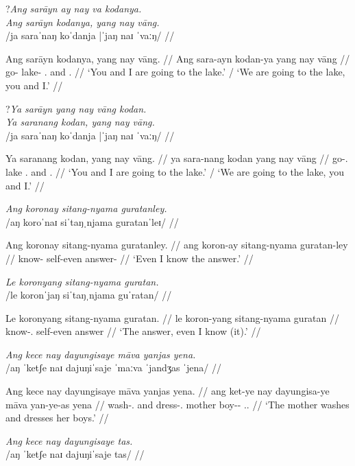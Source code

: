 \documentclass[12pt,a4paper]{scrartcl}
\newcommand{\TsgF}{{\Tsg}.{\F}}
\begin{document}
\ex\begingl
\glpreamble \judge?\textit{Ang sarāyn ay nay va kodanya.} \\
	\textit{Ang sarāyn kodanya, yang nay vāng.} \\
	/ja saraˈnaŋ koˈdanja |ˈjaŋ naɪ ˈvaːŋ/ //

\gla Ang sarāyn kodanya,  yang nay vāng. //
\glb Ang sara-ayn kodan-ya yang nay vāng //
\glc \AgtT{} go-\Fpl{} lake-\Loc{} \Second{}.\Aarg{} and \Fsg{}.\Aarg{} //
\glft `You and I are going to the lake.' / `We are going to the lake, you and I.' //
\endgl

\ex\begingl
\glpreamble \judge?\textit{Ya sarāyn yang nay vāng kodan.} \\
	\textit{Ya saranang kodan, yang nay vāng.} \\
	/ja saraˈnaŋ koˈdanja |ˈjaŋ naɪ ˈvaːŋ/ //

\gla Ya saranang kodan, yang nay vāng. //
\glb ya sara-nang kodan yang nay vāng //
\glc \LocT{} go-\Fpl{}.\Aarg{} lake \Second{}.\Aarg{} and \Fsg{}.\Aarg{} //
\glft `You and I are going to the lake.' / `We are going to the lake, you and I.' //
\endgl

\ex\begingl
\glpreamble \textit{Ang koronay sitang-nyama guratanley.}\\
	/aŋ koroˈnaɪ siˈtaŋˌnjama guratanˈleɪ/ //

\gla Ang koronay sitang-nyama guratanley. //
\glb ang koron-ay sitang-nyama guratan-ley //
\glc \AgtT{} know-\Fsg{} self-even answer-\Parg{} //
\glft `Even I know the answer.' //
\endgl\xe

\ex\begingl
\glpreamble \textit{Le koronyang sitang-nyama guratan.}\\
	/le koronˈjaŋ siˈtaŋˌnjama guˈratan/ //

\gla Le koronyang sitang-nyama guratan. //
\glb le koron-yang sitang-nyama guratan //
\glc \PatT{} know-\Fsg{}.\Aarg{} self-even answer //
\glft `The answer, even I know (it).' //
\endgl\xe

\ex\begingl
\glpreamble \textit{Ang kece nay dayungisaye māva yanjas yena.}\\
	/aŋ ˈketʃe naɪ dajuŋiˈsaje ˈmaːva ˈjandʒas ˈjena/ //

\gla Ang kece nay dayungisaye māva yanjas yena. //
\glb ang ket-ye nay dayungisa-ye māva yan-ye-as yena //
\glc \AgtT{} wash-\TsgF{} and dress-\TsgF{} mother boy-\Pl{}-\Parg{} \TsgF{}.\Gen{} //
\glft `The mother washes and dresses her boys.' //
\endgl\xe

\ex\begingl
\glpreamble \textit{Ang kece nay dayungisaye tas.}\\
	/aŋ ˈketʃe naɪ dajuŋiˈsaje tas/ //
\end{document}
